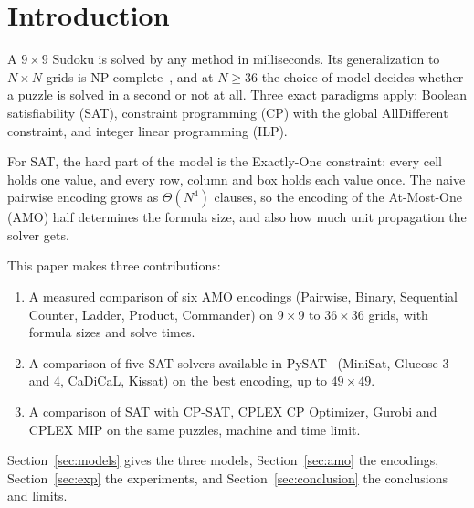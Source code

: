 \section{Introduction}

A $9\times9$ Sudoku is solved by any method in milliseconds. Its generalization to $N\times N$ grids is NP-complete~\cite{yato2003}, and at $N\ge36$ the choice of model decides whether a puzzle is solved in a second or not at all. Three exact paradigms apply: Boolean satisfiability (SAT), constraint programming (CP) with the global $\mathrm{AllDifferent}$ constraint, and integer linear programming (ILP).

For SAT, the hard part of the model is the Exactly-One constraint: every cell holds one value, and every row, column and box holds each value once. The naive pairwise encoding grows as $\Theta(N^4)$ clauses, so the encoding of the At-Most-One (AMO) half determines the formula size, and also how much unit propagation the solver gets.

This paper makes three contributions:
\begin{enumerate}
\item A measured comparison of six AMO encodings (Pairwise, Binary, Sequential Counter, Ladder, Product, Commander) on $9\times9$ to $36\times36$ grids, with formula sizes and solve times.
\item A comparison of five SAT solvers available in PySAT~\cite{pysat} (MiniSat, Glucose 3 and 4, CaDiCaL, Kissat) on the best encoding, up to $49\times49$.
\item A comparison of SAT with CP-SAT, CPLEX CP Optimizer, Gurobi and CPLEX MIP on the same puzzles, machine and time limit.
\end{enumerate}
Section~\ref{sec:models} gives the three models, Section~\ref{sec:amo} the encodings, Section~\ref{sec:exp} the experiments, and Section~\ref{sec:conclusion} the conclusions and limits.
